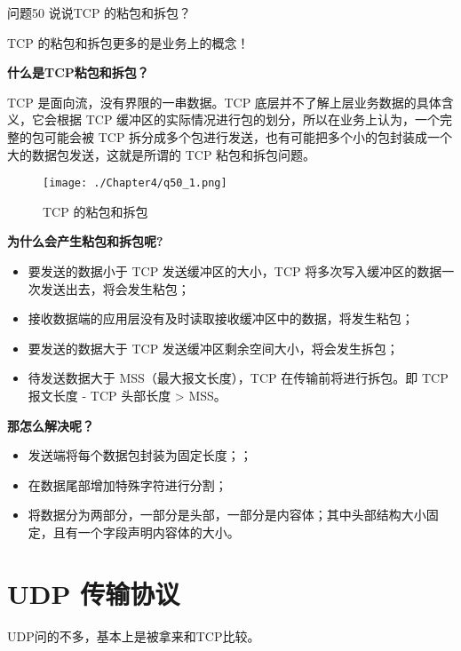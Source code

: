 \documentclass[cn,11pt,color=blue,lang=cn]{elegantbook}
\begin{document}
\begin{custom}{问题50}
说说TCP 的粘包和拆包？
\end{custom}
\begin{solution}
TCP 的粘包和拆包更多的是业务上的概念！

\begin{note} \textbf{什么是TCP粘包和拆包？} \end{note}
TCP 是面向流，没有界限的一串数据。TCP 底层并不了解上层业务数据的具体含义，它会根据 TCP 缓冲区的实际情况进行包的划分，所以在业务上认为，一个完整的包可能会被 TCP 拆分成多个包进行发送，也有可能把多个小的包封装成一个大的数据包发送，这就是所谓的 TCP 粘包和拆包问题。

\begin{figure}[!h]
\centering
\texttt{[image: ./Chapter4/q50\_1.png]}
\caption{TCP 的粘包和拆包}
\label{fig50_1}
\end{figure}

\begin{note} \textbf{为什么会产生粘包和拆包呢?} \end{note}
\begin{itemize}
	\item 要发送的数据小于 TCP 发送缓冲区的大小，TCP 将多次写入缓冲区的数据一次发送出去，将会发生粘包；
	\item 接收数据端的应用层没有及时读取接收缓冲区中的数据，将发生粘包；
	\item 要发送的数据大于 TCP 发送缓冲区剩余空间大小，将会发生拆包；
	\item 待发送数据大于 MSS（最大报文长度），TCP 在传输前将进行拆包。即 TCP 报文长度 - TCP 头部长度 > MSS。
\end{itemize}

\begin{note} \textbf{那怎么解决呢？} \end{note}
\begin{itemize}
	\item 发送端将每个数据包封装为固定长度；；
	\item 在数据尾部增加特殊字符进行分割；
	\item 将数据分为两部分，一部分是头部，一部分是内容体；其中头部结构大小固定，且有一个字段声明内容体的大小。
\end{itemize}
\end{solution}

\section{UDP 传输协议}
UDP问的不多，基本上是被拿来和TCP比较。
\end{document}
